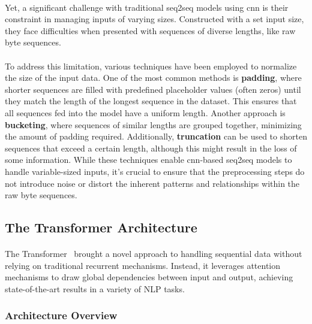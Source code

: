         \paragraph{}Yet, a significant challenge with traditional \acrfull{seq2seq} models using \acrshort{cnn} is their constraint in managing inputs of varying sizes. Constructed with a set input size, they face difficulties when presented with sequences of diverse lengths, like raw byte sequences.

        \paragraph{}To address this limitation, various techniques have been employed to normalize the size of the input data. One of the most common methods is \textbf{padding}, where shorter sequences are filled with predefined placeholder values (often zeros) until they match the length of the longest sequence in the dataset. This ensures that all sequences fed into the model have a uniform length. Another approach is \textbf{bucketing}, where sequences of similar lengths are grouped together, minimizing the amount of padding required. Additionally, \textbf{truncation} can be used to shorten sequences that exceed a certain length, although this might result in the loss of some information. While these techniques enable \acrshort{cnn}-based \acrfull{seq2seq} models to handle variable-sized inputs, it's crucial to ensure that the preprocessing steps do not introduce noise or distort the inherent patterns and relationships within the raw byte sequences.

    \subsection{The Transformer Architecture}

        \paragraph{}The Transformer~\cite{vaswani_attention_2017} brought a novel approach to handling sequential data without relying on traditional recurrent mechanisms. Instead, it leverages attention mechanisms to draw global dependencies between input and output, achieving state-of-the-art results in a variety of NLP tasks.
        
        \subsubsection{Architecture Overview}
        
